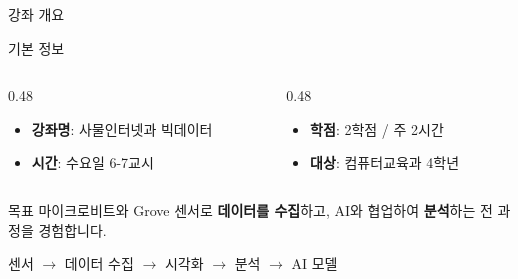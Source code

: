 \documentclass[aspectratio=169, 11pt]{beamer}
\begin{document}
\begin{frame}{강좌 개요}
\begin{block}{기본 정보}
\begin{columns}[T]
\begin{column}{0.48\textwidth}
\begin{itemize}
    \item \textbf{강좌명}: 사물인터넷과 빅데이터
    \item \textbf{시간}: 수요일 6-7교시
\end{itemize}
\end{column}
\begin{column}{0.48\textwidth}
\begin{itemize}
    \item \textbf{학점}: 2학점 / 주 2시간
    \item \textbf{대상}: 컴퓨터교육과 4학년
\end{itemize}
\end{column}
\end{columns}
\end{block}

\vspace{0.5em}

\begin{exampleblock}{목표}
마이크로비트와 Grove 센서로 \textbf{데이터를 수집}하고, AI와 협업하여 \textbf{분석}하는 전 과정을 경험합니다.

\vspace{0.3em}

\begin{center}
센서 $\rightarrow$ 데이터 수집 $\rightarrow$ 시각화 $\rightarrow$ 분석 $\rightarrow$ AI 모델
\end{center}
\end{exampleblock}
\end{frame}
\end{document}
